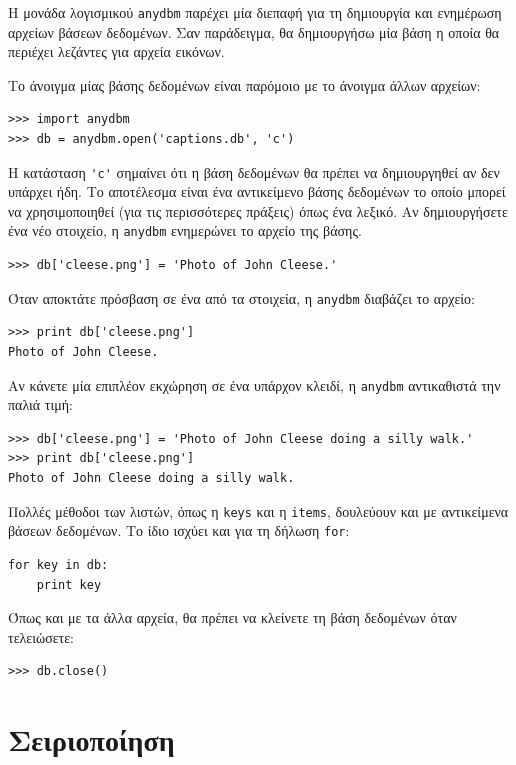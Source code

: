 \documentclass[10pt]{book}
\begin{document}
Η μονάδα λογισμικού {\tt anydbm} παρέχει μία διεπαφή για τη δημιουργία και ενημέρωση 
αρχείων βάσεων δεδομένων. Σαν παράδειγμα, θα δημιουργήσω μία βάση η οποία θα περιέχει λεζάντες 
για αρχεία εικόνων.

Το άνοιγμα μίας βάσης δεδομένων είναι παρόμοιο με το άνοιγμα άλλων αρχείων:

\begin{verbatim}
>>> import anydbm
>>> db = anydbm.open('captions.db', 'c')
\end{verbatim}
%
Η κατάσταση \verb"'c'" σημαίνει ότι η βάση δεδομένων θα πρέπει να δημιουργηθεί
αν δεν υπάρχει ήδη. Το αποτέλεσμα είναι ένα αντικείμενο βάσης δεδομένων το οποίο μπορεί να χρησιμοποιηθεί
(για τις περισσότερες πράξεις) όπως ένα λεξικό. Αν δημιουργήσετε ένα νέο στοιχείο, η {\tt anydbm}
ενημερώνει το αρχείο της βάσης. 


\begin{verbatim}
>>> db['cleese.png'] = 'Photo of John Cleese.'
\end{verbatim}
%
Όταν αποκτάτε πρόσβαση σε ένα από τα στοιχεία, η {\tt anydbm} διαβάζει το αρχείο:

\begin{verbatim}
>>> print db['cleese.png']
Photo of John Cleese.
\end{verbatim}
%
Αν κάνετε μία επιπλέον εκχώρηση σε ένα υπάρχον κλειδί, η {\tt anydbm} αντικαθιστά την παλιά τιμή:

\begin{verbatim}
>>> db['cleese.png'] = 'Photo of John Cleese doing a silly walk.'
>>> print db['cleese.png']
Photo of John Cleese doing a silly walk.
\end{verbatim}
%
Πολλές μέθοδοι των λιστών, όπως η {\tt keys} και η {\tt items}, δουλεύουν και με αντικείμενα βάσεων
δεδομένων. Το ίδιο ισχύει και για τη δήλωση {\tt for}:

\begin{verbatim}
for key in db:
    print key
\end{verbatim}
%
Όπως και με τα άλλα αρχεία, θα πρέπει να κλείνετε τη βάση δεδομένων όταν τελειώσετε:

\begin{verbatim}
>>> db.close()
\end{verbatim}
%


 
\section{Σειριοποίηση}
\end{document}
